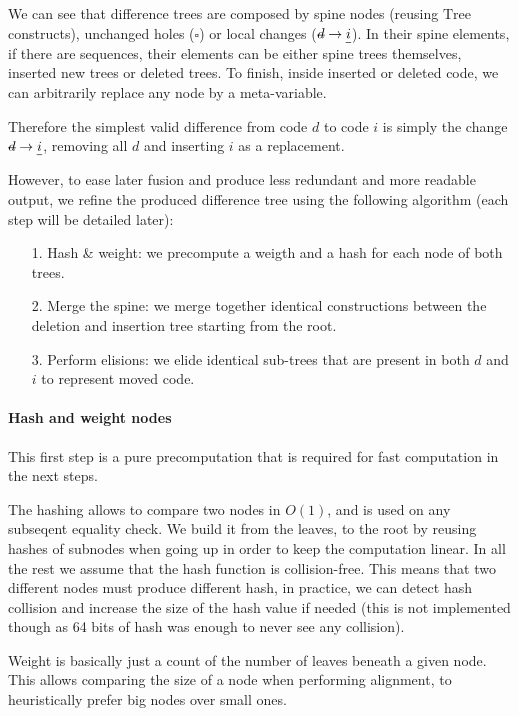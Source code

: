 \documentclass[a4paper,11pt]{article}
\newcommand\typ[1]{\mathrm{#1}}
\newcommand\del[1]{\text{\st{$#1$}}}
\newcommand\ins[1]{\text{\ul{$#1$}}}
\newcommand\change[2]{\del{#1} \rightarrow \ins{#2}}
\begin{document}

We can see that difference trees are composed by spine nodes (reusing
$\typ{Tree}$
constructs), unchanged holes ($\square$) or local changes ($\change{d}{i}$). In
their spine elements, if there are sequences, their elements can be either
spine trees themselves, inserted new trees or deleted trees. To finish,
inside inserted or deleted code, we can arbitrarily replace any node by a
meta-variable.



 Therefore the simplest valid difference from code $d$ to code $i$
is simply the change $\change{d}{i}$, removing all $d$ and inserting $i$ as a
replacement.

 However, to ease later fusion and produce less redundant and more readable
output, we refine the produced difference tree using the following algorithm
(each step will be detailed later):
\begin{itemize}
 \item[1.] Hash \& weight: we precompute a weigth and a hash for each node of
both trees.
 \item[2.] Merge the spine: we merge together identical constructions between
the deletion and insertion tree starting from the root.
 \item[3.] Perform elisions: we elide identical sub-trees that are present in
both $d$ and $i$ to represent moved code.
\end{itemize}

\paragraph{Hash and weight nodes}
This first step is a pure precomputation that is required for fast computation
in the next steps.

The hashing allows to compare two nodes in $O(1)$, and is used on any
subseqent equality check. We build it from the leaves, to the root by reusing
hashes of subnodes when going up in order to keep the computation linear.
In all the rest we assume that the hash function is collision-free. This means
that two different nodes must produce different hash, in practice, we can
detect hash collision and increase the size of the hash value if needed (this
is not implemented though as 64 bits of hash was enough to never see any
collision).

Weight is basically just a count of the number of leaves beneath a given node.
This allows comparing the size of a node when performing alignment, to
heuristically prefer big nodes over small ones.
\end{document}
